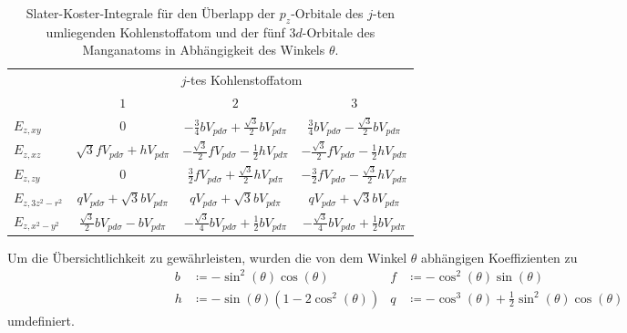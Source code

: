 \begin{table}
    \centering
    \caption{Slater-Koster-Integrale für den Überlapp der $p_z$-Orbitale des $j$-ten umliegenden
    Kohlenstoffatom und der fünf $3d$-Orbitale des Manganatoms in Abhängigkeit des Winkels $\theta$.}
    \label{tab:slaterkosters}
    \begin{tabular}{l c c c}
    & \multicolumn{3}{c}{$j$-tes Kohlenstoffatom}\\
    \cmidrule(lr){2-4}
    & {$1$} & {$2$} & {$3$} \\
    \midrule
    {$E_{z,xy}$      }  & {$0$}                                               & {$-\frac{3}{4}bV_{pd\sigma} + \frac{\sqrt{3}}{2}bV_{pd\pi}$}          & {$ \frac{3}{4}bV_{pd\sigma}-\frac{\sqrt{3}}{2}bV_{pd\pi}$}         \vspace{0.5cm} \\ 
    {$E_{z,xz}$      }  & {$\sqrt{3}fV_{pd\sigma} + hV_{pd\pi}$}              & {$-\frac{\sqrt{3}}{2}fV_{pd\sigma} - \frac{1}{2} hV_{pd\pi}$}         & {$-\frac{\sqrt{3}}{2}fV_{pd\sigma} - \frac{1}{2} hV_{pd\pi}$}      \vspace{0.5cm} \\
    {$E_{z,zy}$      }  & {$0$}                                               & {$ \frac{3}{2}fV_{pd\sigma}+\frac{\sqrt{3}}{2} hV_{pd\pi}$}           & {$-\frac{3}{2}fV_{pd\sigma}-\frac{\sqrt{3}}{2} hV_{pd\pi}$}        \vspace{0.5cm} \\
    {$E_{z,3z^2-r^2}$}  & {$q V_{pd\sigma}+\sqrt{3}bV_{pd\pi}$}               & {$q V_{pd\sigma}+\sqrt{3}bV_{pd\pi}$}                                 & {$q V_{pd\sigma}+\sqrt{3}bV_{pd\pi}$} \vspace{0.5cm} \\
    {$E_{z,x^2-y^2}$ }  & {$\frac{\sqrt{3}}{2}bV_{pd\sigma}-bV_{pd\pi}$}      & {$-\frac{\sqrt{3}}{4}bV_{pd\sigma}+\frac{1}{2}bV_{pd\pi}$}           & {$-\frac{\sqrt{3}}{4}bV_{pd\sigma}+\frac{1}{2}bV_{pd\pi}$}                       \\ 
    \bottomrule
    \end{tabular}
  \end{table}
Um die Übersichtlichkeit zu gewährleisten, wurden die von dem Winkel $\theta$ abhängigen Koeffizienten zu
\begin{align*}
b & \coloneq -\sin^2(\theta) \cos(\theta)        & f &  \coloneq -\cos^2(\theta) \sin(\theta)                             \\                     
h & \coloneq -\sin(\theta)(1-2\cos^2(\theta))    & q &  \coloneq -\cos^3(\theta) + \frac{1}{2}\sin^2(\theta) \cos(\theta)
\end{align*}
umdefiniert.

